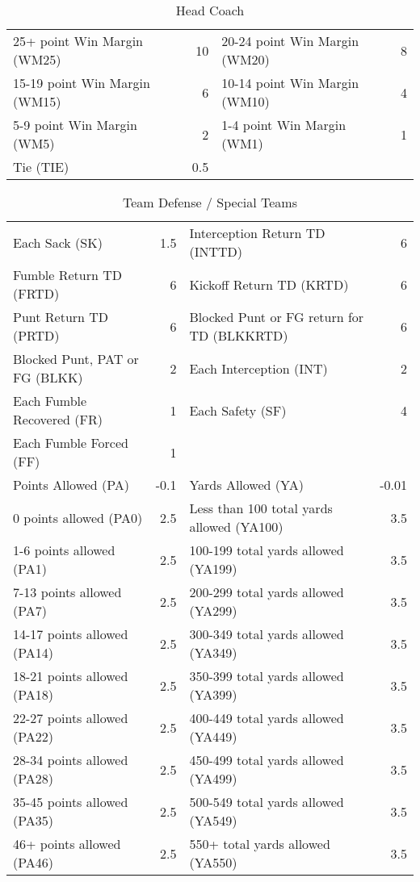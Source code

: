 \documentclass{article}
\begin{document}
    \begin{table}[H]
        \caption{Head Coach}
        \begin{tabular}{lr|lr}
            \hline
            25+ point Win Margin (WM25) & 10 & 20-24 point Win Margin (WM20) & 8\\
            15-19 point Win Margin (WM15) & 6 & 10-14 point Win Margin (WM10) & 4\\
            5-9 point Win Margin (WM5) & 2 & 1-4 point Win Margin (WM1) & 1\\
            Tie (TIE) & 0.5\\
            \hline
        \end{tabular}
    \end{table}
    \begin{table}[H]
        \caption{Team Defense / Special Teams}
        \centering
        \begin{tabular}{lr|lr}
            \hline
            Each Sack (SK) & 1.5 & Interception Return TD (INTTD) & 6\\
            Fumble Return TD (FRTD) & 6 & Kickoff Return TD (KRTD) & 6\\
            Punt Return TD (PRTD) & 6 & Blocked Punt or FG return for TD (BLKKRTD) & 6\\
            Blocked Punt, PAT or FG (BLKK) & 2 & Each Interception (INT) & 2\\
            Each Fumble Recovered (FR) & 1 & Each Safety (SF) & 4\\
            Each Fumble Forced (FF) & 1\\
            Points Allowed (PA) & -0.1 & Yards Allowed (YA) & -0.01\\
            0 points allowed (PA0) & 2.5 & Less than 100 total yards allowed (YA100) & 3.5 \\
            1-6 points allowed (PA1) & 2.5 & 100-199 total yards allowed (YA199) & 3.5\\
            7-13 points allowed (PA7) & 2.5 & 200-299 total yards allowed (YA299) & 3.5\\
            14-17 points allowed (PA14) & 2.5 & 300-349 total yards allowed (YA349) & 3.5\\
            18-21 points allowed (PA18) & 2.5 & 350-399 total yards allowed (YA399) & 3.5\\
            22-27 points allowed (PA22) & 2.5 & 400-449 total yards allowed (YA449) & 3.5\\
            28-34 points allowed (PA28) & 2.5 & 450-499 total yards allowed (YA499) & 3.5\\
            35-45 points allowed (PA35) & 2.5 & 500-549 total yards allowed (YA549) & 3.5\\
            46+ points allowed (PA46) & 2.5 & 550+ total yards allowed (YA550) & 3.5\\
            \hline
        \end{tabular}
    \end{table}
\end{document}
